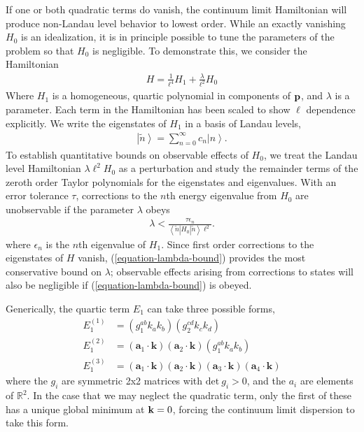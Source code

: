 \documentclass[aps,prb,twocolumn,letterpaper,twoside,nobalancelastpage,groupedaddress,amsmath,amssymb,floatfix,citeautoscript]{revtex4-1}
\begin{document}
If one or both quadratic terms do vanish, the continuum limit Hamiltonian will produce non-Landau level behavior to lowest order. While an exactly vanishing $H_0$ is an idealization, it is in principle possible to tune the parameters of the problem so that $H_0$ is negligible. To demonstrate this, we consider the Hamiltonian
\begin{align}
\label{perturbation-hamiltonian}
H = \frac{1}{\ell^4}H_1 + \frac{\lambda}{\ell^2} H_0 
\end{align}
Where $H_1$ is a homogeneous, quartic polynomial in components of ${\bf p}$, and $\lambda$ is a parameter. Each term in the Hamiltonian has been scaled to show $\ell$ dependence explicitly. We write the eigenstates of $H_1$ in a basis of Landau levels, 
\begin{align}
\label{landau-level-expansion}
\left|\tilde{n}\right> = \sum_{n=0}^{\infty} c_n \left|n\right>.
\end{align}
To establish quantitative bounds on observable effects of $H_0$, we treat the Landau level Hamiltonian $\lambda\ell^2 H_0$ as a perturbation and study the remainder terms of the zeroth order Taylor polynomials for the eigenstates and eigenvalues. With an error tolerance $\tau$, corrections to the $n$th energy eigenvalue from $H_0$ are unobservable if the parameter $\lambda$ obeys
\begin{align}
\label{equation-lambda-bound}
\lambda < \frac{\tau \epsilon_n}{\left<\tilde{n}\right|\!H_0\!\left|\tilde{n}\right>\ell^2}.
\end{align}
where $\epsilon_n$ is the $n$th eigenvalue of $H_1$. Since first order corrections to the eigenstates of $H$ vanish, (\ref{equation-lambda-bound}) provides the most conservative bound on $\lambda$; observable effects arising from corrections to states will also be negligible if (\ref{equation-lambda-bound}) is obeyed.

Generically, the quartic term $E_1$ can take three possible forms, 
\begin{align}
\label{dispersion-metric}
E^{(1)}_1 &= (g_1^{ab}k_a k_b) (g_2^{cd} k_c k_d)\\
E^{(2)}_1 &= (\mathbf{a}_1 \cdot \mathbf{k})(\mathbf{a}_2 \cdot \mathbf{k})(g_1^{ab}k_a k_b)\\
E^{(3)}_1 &= (\mathbf{a}_1 \cdot \mathbf{k})(\mathbf{a}_2 \cdot \mathbf{k})(\mathbf{a}_3 \cdot \mathbf{k})(\mathbf{a}_4 \cdot \mathbf{k})
\end{align}
where the $g_i$ are symmetric 2x2 matrices with $\text{det}~g_i > 0$, and the $a_i$ are elements of $\mathbb{R}^2$. In the case that we may neglect the quadratic term, only the first of these has a unique global minimum at ${\bf k}=0$, forcing the continuum limit dispersion to take this form. 
\end{document}
